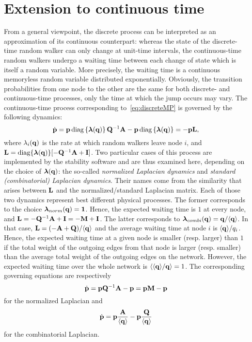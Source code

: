 \section{Extension to continuous time}
From a general viewpoint, the discrete process can be interpreted as an approximation of its continuous counterpart: whereas the state of the discrete-time random walker can only change at unit-time intervals, the continuous-time random walkers undergo a waiting time between each change of state which is itself a random variable. More precisely, the waiting time is a continuous memoryless random variable distributed exponentially. Obviously, the transition probabilities from one node to the other are the same for both discrete- and continuous-time processes, only the time at which the jump occurs may vary. The continuous-time process corresponding to~\eqref{eq:discreteMP} is governed by the following dynamics:
\begin{equation} \label{eq:continuousMP_general}
    	\dot{\mathbf p} = \mathbf p \operatorname{diag}\left\{\boldsymbol \lambda(\mathbf q)\right\} \mathbf Q^{-1} \mathbf A - \mathbf p \operatorname{diag}\left\{\boldsymbol \lambda(\mathbf q)\right\} = -\mathbf p \mathbf L,
\end{equation}
where $\lambda_i(\mathbf q)$ is the rate at which random walkers leave node $i$, and $\mathbf L = \operatorname{diag}\{\boldsymbol \lambda(\mathbf q)\}[-\mathbf Q^{-1} \mathbf A + \mathbf I]$. Two particular cases of this process are implemented by the stability software and are thus examined here, depending on the choice of $\boldsymbol \lambda(\mathbf q)$: the so-called \textit{normalized Laplacian dynamics} and \textit{standard (combinatorial) Laplacian dynamics}. Their names come from the similarity that arises between $\mathbf L$ and the normalized/standard Laplacian matrix. Each of those two dynamics represent best different physical processes. The former corresponds to the choice $\boldsymbol \lambda_{norm}(\mathbf q) = \mathbf 1$. Hence, the expected waiting time is $1$ at every node, and $\mathbf L = -\mathbf Q^{-1} \mathbf A + \mathbf I = -\mathbf M + \mathbf I$. The latter corresponds to $\boldsymbol \lambda_{combi}(\mathbf q) = \mathbf q/\langle \mathbf q \rangle$. In that case, $\mathbf L = (-\mathbf A + \mathbf Q)/\langle \mathbf q \rangle$ and the average waiting time at node $i$ is $\langle \mathbf q \rangle/q_i$. Hence, the expected waiting time at a given node is smaller (resp. larger) than $1$ if the total weight of the outgoing edges from that node is larger (resp. smaller) than the average total weight of the outgoing edges on the network. However, the expected waiting time over the whole network is $\langle \langle \mathbf q \rangle/\mathbf q \rangle = 1$. The corresponding governing equations are respectively 
\begin{equation} \label{eq:continuousMP_norm}
	\dot{\mathbf p} = \mathbf p \mathbf Q^{-1} \mathbf A - \mathbf p = \mathbf p \mathbf M - \mathbf p
\end{equation}
for the normalized Laplacian and
\begin{equation} \label{eq:continuousMP_combi}
    	\dot{\mathbf p} = \mathbf p \frac{\mathbf A}{\langle \mathbf q \rangle} - \mathbf p\frac{\mathbf Q}{\langle \mathbf q \rangle}
\end{equation}
for the combinatorial Laplacian.

